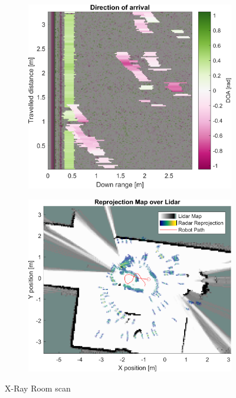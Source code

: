 \begin{figure}[htbp]
\begin{subfigure}[t]{0.475\linewidth}
    \end{subfigure}\bigskip\\
    \begin{subfigure}[t]{0.475\linewidth}
        \centering
        \includegraphics[width=\linewidth,max height=.475\textheight]{gfx/results/xrayroom_doa.png}
    \end{subfigure}%
    \hfill%
    \begin{subfigure}[t]{0.475\linewidth}
        \centering
        \includegraphics[width=\linewidth,max height=.475\textheight]{gfx/results/xrayroom_map.png}
    \end{subfigure}%
    \caption{X-Ray Room scan}
\end{figure}

